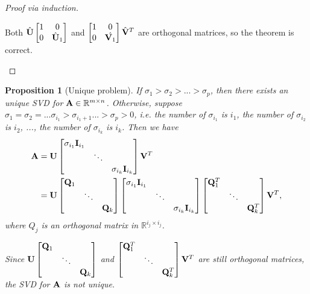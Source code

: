 \documentclass[11pt]{article}
\def\A{{\bf A}}
\def\I{{\bf I}}
\def\U{{\bf U}}
\def\V{{\bf V}}
\def\Q{{\bf Q}}
\def\BR{{\mathbb R}}
\newtheorem{proposition}{Proposition}[section]
\begin{document}
\begin{proof}[Proof via induction]
\begin{enumerate}
       Both $\hat{\U} \begin{bmatrix} 1 & 0 \\ 0 & \hat{\U}_1 \end{bmatrix}$ and $\begin{bmatrix} 1 & 0 \\ 0 & \hat{\V_1} \end{bmatrix} \hat{\V}^T$ are orthogonal matrices,
       so the theorem is correct.
\end{enumerate}   
\end{proof}

\begin{proposition}[Unique problem]
 If $\sigma_1 > \sigma_2 > ... > \sigma_p$, then there exists an unique SVD for $\A \in \BR^{m \times n}$.
 Otherwise, suppose $\sigma_1 = \sigma_2 = ... \sigma_{i_1} > \sigma_{i_1+1} ... > \sigma_p > 0$, 
 i.e. the number of $\sigma_{i_1}$ is $i_1$, the number of $\sigma_{i_2}$ is $i_2$, ..., the number of $\sigma_{i_k}$ is $i_k$.
 Then we have
 \[\begin{aligned} 
    \A &= \U \begin{bmatrix} \sigma_{i_1}\I_{i_1} & & \\ & \ddots & \\ & & \sigma_{i_k}\I_{i_k} \end{bmatrix} \V^T  \\
       &= \U \begin{bmatrix} \Q_1 & & \\ & \ddots & \\ & & \Q_k \end{bmatrix} \begin{bmatrix} \sigma_{i_1}\I_{i_1} & & \\ & \ddots & \\ & & \sigma_{i_k}\I_{i_k} \end{bmatrix} \begin{bmatrix} \Q_1^T & & \\ & \ddots & \\ & & \Q_k^T \end{bmatrix} \V^T,
 \end{aligned}\]
 where $Q_j$ is an orthogonal matrix in $\BR^{i_j\times i_j}$. 
 
 Since  $\U\begin{bmatrix} \Q_1 & & \\ & \ddots & \\ & & \Q_k \end{bmatrix}$ and $\begin{bmatrix} \Q_1^T & & \\ & \ddots & \\ & & \Q_k^T \end{bmatrix} \V^T$ are still orthogonal matrices,
 the SVD for $\A$ is not unique.
 
\end{proposition}
\end{document}
